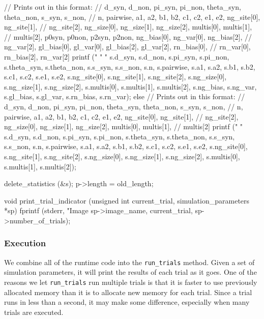 \documentclass{article}
\begin{document}
\begin{ccode}
{{    // Prints out in this format:
    // d_syn, d_non, pi_syn, pi_non, theta_syn, theta_non, s_syn, s_non,
    // n, pairwise, a1, a2, b1, b2, c1, c2, e1, e2, ng_site[0], ng_site[1],
    // ng_site[2], ng_size[0], ng_size[1], ng_size[2], multis[0], multis[1],
    // multis[2], p0syn, p0non, p2syn, p2non, ng_bias[0], ng_var[0], ng_bias[2],
    // ng_var[2], gl_bias[0], gl_var[0], gl_bias[2], gl_var[2], rn_bias[0],
    // rn_var[0], rn_bias[2], rn_var[2]
    printf ("%
	    "%
	    "%
	    s.d_syn, s.d_non, s.pi_syn, s.pi_non, s.theta_syn, s.theta_non,
	    s.s_syn, s.s_non, s.n, s.pairwise, s.a1, s.a2, s.b1, s.b2, s.c1,
	    s.c2, s.e1, s.e2, s.ng_site[0], s.ng_site[1], s.ng_site[2],
	    s.ng_size[0], s.ng_size[1], s.ng_size[2], s.multis[0], s.multis[1],
	    s.multis[2], s.ng_bias, s.ng_var, s.gl_bias, s.gl_var, s.rn_bias,
	    s.rn_var);
  } else {
    // Prints out in this format:
    // d_syn, d_non, pi_syn, pi_non, theta_syn, theta_non, s_syn, s_non,
    // n, pairwise, a1, a2, b1, b2, c1, c2, e1, e2, ng_site[0], ng_site[1],
    // ng_site[2], ng_size[0], ng_size[1], ng_size[2], multis[0], multis[1],
    // multis[2]
    printf ("%
	    "%
	    s.d_syn, s.d_non, s.pi_syn, s.pi_non, s.theta_syn, s.theta_non,
	    s.s_syn, s.s_non, s.n, s.pairwise, s.a1, s.a2, s.b1, s.b2, s.c1,
	    s.c2, s.e1, s.e2, s.ng_site[0], s.ng_site[1], s.ng_site[2],
	    s.ng_size[0], s.ng_size[1], s.ng_size[2], s.multis[0], s.multis[1],
	    s.multis[2]);
  }

  delete_statistics (&s);
  p->length = old_length;
}

void print_trial_indicator (unsigned int current_trial, simulation_parameters *sp) {
  fprintf (stderr, "Image %
         sp->image_name, current_trial, sp->number_of_trials);
}
\end{ccode}

      \subsubsection{Execution}

	We combine all of the runtime code into the \verb|run_trials| method.
	Given a set of simulation parameters, it will print the results of each
	trial as it goes. One of the reasons we let \verb|run_trials| run
	multiple trials is that it is faster to use previously allocated memory
	than it is to allocate new memory for each trial. Since a trial runs in
	less than a second, it may make some difference, especially when many
	trials are executed.
\end{document}
